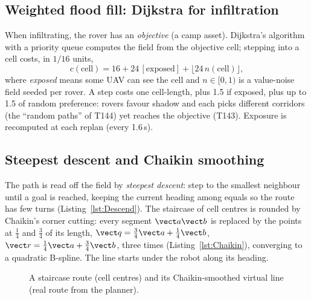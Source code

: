 \subsection{Weighted flood fill: Dijkstra for infiltration}
When infiltrating, the rover has an \emph{objective} (a camp asset). Dijkstra's algorithm with a priority queue computes the field from the objective cell; stepping into a cell costs, in $1/16$ units,
\begin{equation}c(\text{cell})=16+24\,[\text{exposed}]+\lfloor24\,n(\text{cell})\rfloor,\end{equation}
where \emph{exposed} means some UAV can see the cell and $n\in[0,1)$ is a value-noise field seeded per rover. A step costs one cell-length, plus 1.5 if exposed, plus up to 1.5 of random preference: rovers favour shadow and each picks different corridors (the ``random paths'' of T144) yet reaches the objective (T143). Exposure is recomputed at each replan (every 1.6\,s).
\lstDijkstra

\subsection{Steepest descent and Chaikin smoothing}
The path is read off the field by \emph{steepest descent}: step to the smallest neighbour until a goal is reached, keeping the current heading among equals so the route has few turns (Listing~\ref{lst:Descend}). The staircase of cell centres is rounded by Chaikin's corner cutting: every segment $\vect a\vect b$ is replaced by the points at $\tfrac14$ and $\tfrac34$ of its length, $\vect q=\tfrac34\vect a+\tfrac14\vect b$, $\vect r=\tfrac14\vect a+\tfrac34\vect b$, three times (Listing~\ref{lst:Chaikin}), converging to a quadratic B-spline. The line starts under the robot along its heading.
\lstDescend
\lstChaikin
\begin{figure}[h]
\centering
{}
\caption{A staircase route (cell centres) and its Chaikin-smoothed virtual line (real route from the planner).}
\end{figure}

